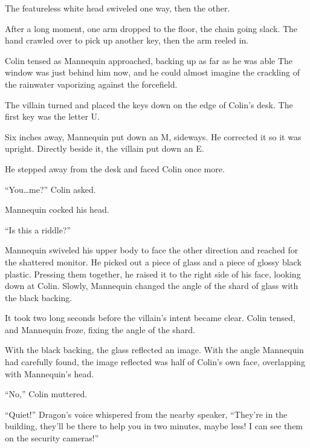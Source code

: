 The featureless white head swiveled one way, then the other.



After a long moment, one arm dropped to the floor, the chain going slack.  The hand crawled over to pick up another key, then the arm reeled in.



Colin tensed as Mannequin approached, backing up as far as he was able  The window was just behind him now, and he could almost imagine the crackling of the rainwater vaporizing against the forcefield.



The villain turned and placed the keys down on the edge of Colin's desk.  The first key was the letter U.



Six inches away, Mannequin put down an M, sideways.  He corrected it so it was upright.  Directly beside it, the villain put down an E.



He stepped away from the desk and faced Colin once more.



``You\ldots me?''  Colin asked.



Mannequin cocked his head.



``Is this a riddle?''



Mannequin swiveled his upper body to face the other direction and reached for the shattered monitor.  He picked out a piece of glass and a piece of glossy black plastic.  Pressing them together, he raised it to the right side of his face, looking down at Colin.  Slowly, Mannequin changed the angle of the shard of glass with the black backing.



It took two long seconds before the villain's intent became clear.  Colin tensed, and Mannequin froze, fixing the angle of the shard.



With the black backing, the glass reflected an image.  With the angle Mannequin had carefully found, the image reflected was half of Colin's own face, overlapping with Mannequin's head.



``No,'' Colin muttered.



``Quiet!''  Dragon's voice whispered from the nearby speaker, ``They're in the building, they'll be there to help you in two minutes, maybe less!  I can see them on the security cameras!''



